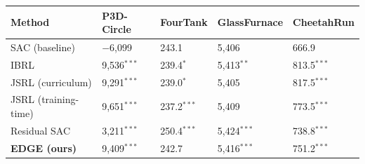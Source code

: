 \begin{tabular}{lllll}
\toprule
\textbf{Method} & \textbf{P3D-Circle} & \textbf{FourTank} & \textbf{GlassFurnace} & \textbf{CheetahRun} \\
\midrule
SAC (baseline) & $-$6{,}099 & \phantom{+}243.1 & \phantom{+}5{,}406 & \phantom{+}666.9 \\
IBRL & \phantom{+}9{,}536$^{***}$ & \phantom{+}239.4$^{*}$ & \phantom{+}5{,}413$^{**}$ & \phantom{+}813.5$^{***}$ \\
JSRL (curriculum) & \phantom{+}9{,}291$^{***}$ & \phantom{+}239.0$^{*}$ & \phantom{+}5{,}405 & \phantom{+}817.5$^{***}$ \\
JSRL (training-time) & \phantom{+}9{,}651$^{***}$ & \phantom{+}237.2$^{***}$ & \phantom{+}5{,}409 & \phantom{+}773.5$^{***}$ \\
Residual SAC & \phantom{+}3{,}211$^{***}$ & \phantom{+}250.4$^{***}$ & \phantom{+}5{,}424$^{***}$ & \phantom{+}738.8$^{***}$ \\
\midrule
\textbf{EDGE (ours)} & \phantom{+}9{,}409$^{***}$ & \phantom{+}242.7 & \phantom{+}5{,}416$^{***}$ & \phantom{+}751.2$^{***}$ \\
\bottomrule
\end{tabular}
